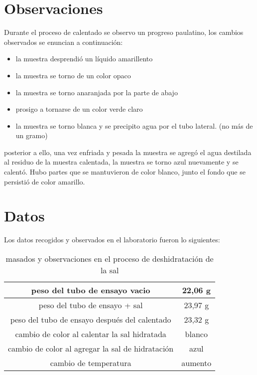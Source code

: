 \documentclass{article}
\begin{document}
\section{Observaciones}
 Durante el proceso de calentado se observo un progreso paulatino, los cambios observados se enuncian a continuación:
\begin{itemize}
 \item la muestra desprendió un líquido amarillento
 \item la muestra se torno de un color opaco
 \item la muestra se torno anaranjada por la parte de abajo
 \item prosigo a tornarse de un color verde claro
 \item la muestra se torno blanca y se precipito agua por el tubo lateral. (no más de un gramo)
\end{itemize}
 posterior a ello, una vez enfriada y pesada la muestra se agregó el agua destilada al residuo de la muestra calentada, la muestra se torno azul nuevamente y se calentó. Hubo partes que se mantuvieron de color blanco, junto el fondo que se persistió de color amarillo.

\section{Datos}


Los datos recogidos y observados en el laboratorio fueron lo siguientes: 

\begin{table} [H]
\centering
\begin{tabular}{|c|c|}
\hline 
\rule[-1ex]{0pt}{2.5ex} peso del tubo de ensayo vacio & 22,06 g \\ 
\hline 
\rule[-1ex]{0pt}{2.5ex} peso del tubo de ensayo + sal & 23,97 g \\ 
\hline 
\rule[-1ex]{0pt}{2.5ex} peso del tubo de ensayo después del calentado & 23,32 g  \\ 
\hline 
\rule[-1ex]{0pt}{2.5ex} cambio de color al calentar la sal hidratada & blanco  \\ 
\hline 
\rule[-1ex]{0pt}{2.5ex} cambio de color al agregar la sal de hidratación & azul \\ 
\hline 
\rule[-1ex]{0pt}{2.5ex} cambio de temperatura  & aumento \\ 
\hline 
\end{tabular} 
\caption{masados y observaciones en el proceso de deshidratación de la sal}
\end{table}
\end{document}
